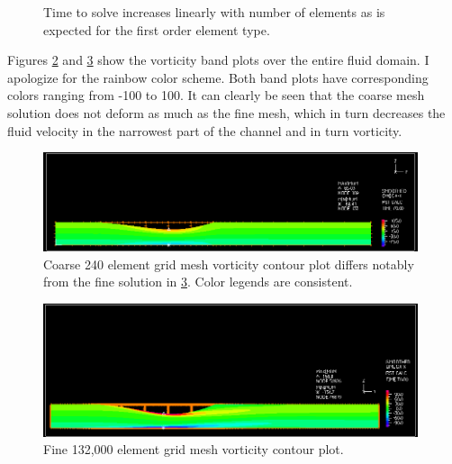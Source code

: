 \documentclass[10pt,english]{article}
\begin{document}
\begin{figure}[h]
\begin{minipage}{.38\textwidth}
\vspace{-8pt}
  \caption{Time to solve increases linearly with number of elements as is expected for the first order element type. }
\label{f:3b_time_cells}
\end{minipage}
\end{figure}

\newpage
Figures \ref{f:Mesh0_5_Contour} and \ref{f:Mesh5_0_Contour} show the vorticity band plots over the entire fluid domain.  I apologize for the rainbow color scheme.  Both band plots have corresponding colors ranging from -100 to 100.  It can clearly be seen that the coarse mesh solution does not deform as much as the fine mesh, which in turn decreases the fluid velocity in the narrowest part of the channel and in turn vorticity.  

\vspace{30pt}

\begin{figure}[h!]
\centering
\includegraphics[trim={0.8cm 0.2cm 0.7cm 0.2cm},clip,width=0.98\textwidth]{Mesh0_5_Contour.png}
\caption{Coarse 240 element grid mesh vorticity contour plot differs notably from the fine solution in \cref{f:Mesh5_0_Contour}.  Color legends are consistent.}
\label{f:Mesh0_5_Contour}
\end{figure}

\vspace{20pt}

\begin{figure}[h!]
\centering
\includegraphics[trim={0.5cm 0.2cm 0.6cm 3.5cm},clip,width=0.98\textwidth]{Mesh5_0_Contour.png}
\caption{Fine 132,000 element grid mesh vorticity contour plot.}
\label{f:Mesh5_0_Contour}
\end{figure}
\end{document}
